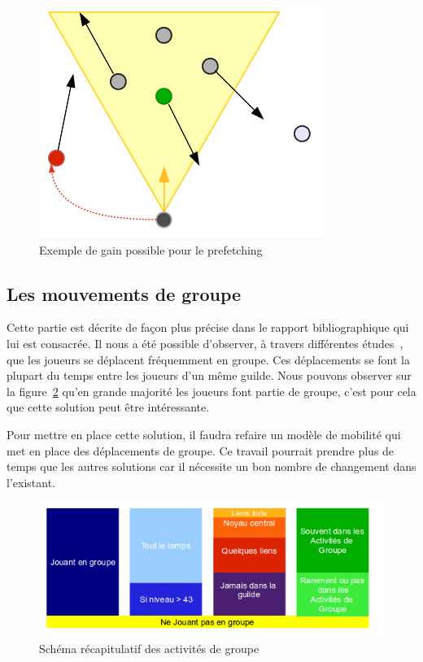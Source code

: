 	\begin{figure}[!h]
        \centering
        \includegraphics[scale=0.45]{./Ressources/Images/prefetchav.png}
        \caption{Exemple de gain possible pour le prefetching}
        \label{prefetchav}
        \end{figure}

\newpage
\subsection{Les mouvements de groupe}
Cette partie est décrite de façon plus précise dans le rapport bibliographique qui lui est consacrée. Il nous a été possible d'observer, à travers différentes études~\cite{1124834,1124834,1031667}, que les joueurs se déplacent fréquemment en groupe. Ces déplacements se font la plupart du temps entre les joueurs d'un même guilde. Nous pouvons observer sur la figure~\ref{recapstat} qu'en grande majorité les joueurs font partie de groupe, c'est pour cela que cette solution peut être intéressante. 
\par Pour mettre en place cette solution, il faudra refaire un modèle de mobilité qui met en place des déplacements de groupe. Ce travail pourrait prendre plus de temps que les autres solutions car il nécessite un bon nombre de changement dans l'existant.

	\vspace{1cm}
        \begin{figure}[!h]
        \centering
        \includegraphics[scale=0.65]{./Ressources/Images/recapstat.png}
        \caption{Schéma récapitulatif des activités de groupe}
        \label{recapstat}
        \end{figure}

